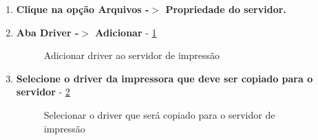 \begin{enumerate}

	\item \textbf{Clique na opção Arquivos -$>$ Propriedade do servidor.}%
	
	
 	\item \textbf{Aba Driver -$>$ Adicionar} - \ref{adicionar_driver}
	\begin{figure}[ht]
	   	\centering
	   	\caption{Adicionar driver ao servidor de impressão}
	    \label{adicionar_driver}
	\end{figure}
	
	\pagebreak
	
	\item \textbf{Selecione o driver da impressora que deve ser copiado para o servidor} - \ref{selecionar_driver}
	\begin{figure}[ht]
	   	\centering
	   	\caption{Selecionar o driver que será copiado para o servidor de impressão}
	    \label{selecionar_driver}
	\end{figure}
	

\end{enumerate}
